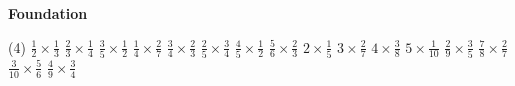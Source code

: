 \documentclass[17pt,a4paper,landscape]{extarticle}
\begin{document}
\sffamily
\boldmath

\boldmath

\vspace*{0.4em}
{\LARGE \textbf{Foundation}}
\begin{tasks}(4)
\task \mbox{$\frac{1}{2}\times\frac{1}{3}$}
\task \mbox{$\frac{2}{3}\times\frac{1}{4}$}
\task \mbox{$\frac{3}{5}\times\frac{1}{2}$}
\task \mbox{$\frac{1}{4}\times\frac{2}{7}$}
\task \mbox{$\frac{3}{4}\times\frac{2}{3}$}
\task \mbox{$\frac{2}{5}\times\frac{3}{4}$}
\task \mbox{$\frac{4}{5}\times\frac{1}{2}$}
\task \mbox{$\frac{5}{6}\times\frac{2}{3}$}
\task \mbox{$2\times\frac{1}{5}$}
\task \mbox{$3\times\frac{2}{7}$}
\task \mbox{$4\times\frac{3}{8}$}
\task \mbox{$5\times\frac{1}{10}$}
\task \mbox{$\frac{2}{9}\times\frac{3}{5}$}
\task \mbox{$\frac{7}{8}\times\frac{2}{7}$}
\task \mbox{$\frac{3}{10}\times\frac{5}{6}$}
\task \mbox{$\frac{4}{9}\times\frac{3}{4}$}
\end{tasks}
\end{document}
